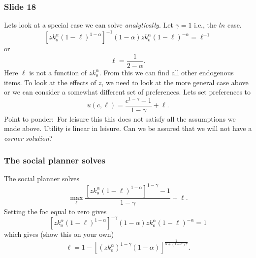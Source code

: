 \documentclass[aspectratio=169]{ltx-talk}
\begin{document}
\begin{frame}
\frametitle{Slide 18}
Lets look at a special case we can solve \textit{analytically}. Let $\gamma
=1$ i.e., the $ln$ case.%
\begin{equation*}
\left[ zk_{o}^{\alpha }\left( 1-\ell \right) ^{1-\alpha }\right] ^{-1}\left(
1-\alpha \right) zk_{o}^{\alpha }\left( 1-\ell \right) ^{-\alpha }=\ell ^{-1}
\end{equation*}%
or 
\begin{equation*}
\ell =\frac{1}{2-\alpha }.
\end{equation*}%
Here $\ell $ is not a function of $zk_{o}^{\alpha }.$ From this we can find
all other endogenous items. To look at the effects of $z$, we need to look
at the more general case above or we can consider a somewhat different set
of preferences. Lets set preferences to 
\begin{equation*}
u\left( c,\ell \right) =\frac{c^{1-\gamma }-1}{1-\gamma }+\ell .
\end{equation*}%
Point to ponder:\ For leisure this this does not satisfy all the assumptions
we made above. Utility is linear in leisure. Can we be assured that we will
not have a \textit{corner solution}?
\end{frame}

\begin{frame}
\frametitle{The social planner solves}
The social planner solves%
\begin{equation*}
\underset{\ell }{\max }\frac{\left[ zk_{o}^{\alpha }\left( 1-\ell \right)
^{1-\alpha }\right] ^{1-\gamma }-1}{1-\gamma }+\ell .
\end{equation*}%
Setting the foc equal to zero gives%
\begin{equation*}
\left[ zk_{o}^{\alpha }\left( 1-\ell \right) ^{1-\alpha }\right] ^{-\gamma
}\left( 1-\alpha \right) zk_{o}^{\alpha }\left( 1-\ell \right) ^{-\alpha }=1
\end{equation*}%
which gives (show this on your own)%
\begin{equation*}
\ell =1-\left[ \left( zk_{o}^{\alpha }\right) ^{1-\gamma }\left( 1-\alpha
\right) \right] ^{\frac{1}{\alpha +\left( 1-\alpha \right) \gamma }}.
\end{equation*}%
\end{frame}
\end{document}
